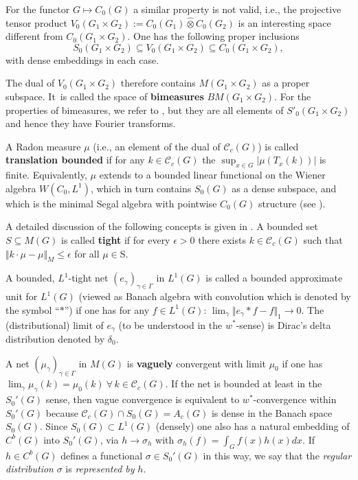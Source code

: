 \documentclass[graybox]{svmult}
\begin{document}
For the functor $G \mapsto C_0(G)$ a similar property is not valid, i.e.,
the projective  tensor product
$V_{0}(G_{1}\times G_{2}) := C_{0}(G_{1}) \hat{\otimes} C_{0}(G_{2})$
is an interesting space different from $C_0(G_{1}\times G_{2})$.
One has the following proper inclusions
\[
S_0(G_{1}\times G_{2})  \subseteq
V_{0}(G_{1}\times G_{2})  \subseteq
C_{0}(G_{1}\times G_{2}),
\]
with dense embeddings in each case.

The dual of $V_{0}(G_{1}\times G_{2})$ therefore contains
$M(G_1 \times G_2)$ as a proper subspace.
It~is called the space of \textbf{bimeasures}
$BM(G_{1}\times G_{2})$.
For the properties of bimeasures, we refer to \cite{grsc84},
but they are all elements of $S'_0(G_{1}\times G_{2})$
and hence they have Fourier transforms.

A Radon measure $\mu$
(i.e., an element of the dual of $\mathcal{C}_c(G)$) is
called \textbf{translation bounded} if for any
$k \in \mathcal{C}_c(G)$ the
$\sup_{x \in G} |\mu(T_x(k))|$ is finite.
Equivalently, $\mu$ extends to a bounded linear functional
on the Wiener algebra $W(C_0,L^1)$, which in turn
contains ${S_{0}(G)}$ as a dense subspace, and which is the
minimal Segal algebra with pointwise $C_0(G)$ structure
(see \cite{fe77-3}).

A detailed discussion of the following concepts is given in
\cite{fe84}. A bounded set $S \subseteq  M(G)$  is called \textbf{tight} if
for every $\epsilon  > 0$  there exists
  $k\in \mathcal{C}_c(G)$ such that $\Vert k\cdot \mu  - \mu \Vert_M
 \le  \epsilon $  for all $\mu \in {}$S.

A bounded, $L^1$-tight net $(e_{\gamma })_{\gamma \in \varGamma }$  in
$L^{1}(G)$ is called a bounded approximate unit for
$L^{1}(G)$ (viewed as Banach algebra with convolution
which is denoted by the symbol ``$\ast$'')
if one has for any $f \in L^1(G)$:
$\lim_{\gamma } \Vert  e_{\gamma }\ast {}f -
f \Vert _{1} \rightarrow  0. $
The (distributional) limit of $e_{\gamma}$ (to be understood in the ${w}^*$-sense)
is Dirac's delta distribution denoted by $\delta_0$.

A net $(\mu _{\gamma })_{\gamma \in \varGamma }$ in $M(G)$
 is \textbf{vaguely} convergent with limit $\mu _{0}$ if one has $\lim_{\gamma } \mu _{\gamma}(k) = \mu _{0}(k) \ \forall \, k \in \mathcal{C}_c(G).$
If the net is bounded at least in the ${S_0{ '}(G)}$ sense, then
vague convergence is equivalent to ${w}^*$-convergence within
${S_0{ '}(G)}$ because $\mathcal{C}_c(G) \cap {S_{0}(G)} = A_c(G)$ is dense
in the Banach space ${S_{0}(G)}$.
Since ${S_{0}(G)} \subset L^1(G)$ (densely) one also
has a natural embedding of $C^b(G)$ into ${S_0{ '}(G)}$, via
$ h \to \sigma_h$ with $\sigma_h(f) = \int_G f(x) h(x) dx$.
If $h \in C^b(G)$ defines a functional  $\sigma \in {S_0{ '}(G)}$
in this way, we say that the \textit{regular distribution}
$\sigma$ is \textit{represented by} $h$.
\end{document}
